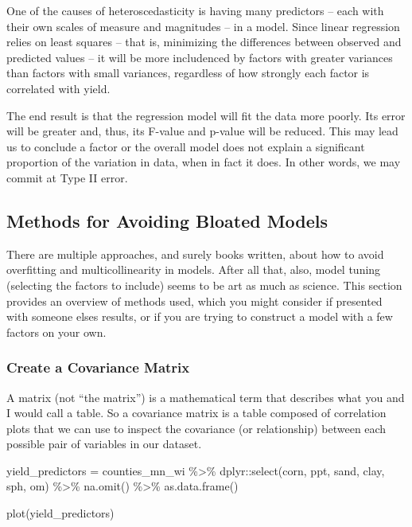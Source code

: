\documentclass[
]{book}
\newenvironment{Shaded}{\begin{snugshade}}{\end{snugshade}}
\newcommand{\FunctionTok}[1]{\textcolor[rgb]{0.00,0.00,0.00}{#1}}
\newcommand{\NormalTok}[1]{#1}
\newcommand{\OtherTok}[1]{\textcolor[rgb]{0.56,0.35,0.01}{#1}}
\newcommand{\SpecialCharTok}[1]{\textcolor[rgb]{0.00,0.00,0.00}{#1}}
\begin{document}
One of the causes of heteroscedasticity is having many predictors -- each with their own scales of measure and magnitudes -- in a model. Since linear regression relies on least squares -- that is, minimizing the differences between observed and predicted values -- it will be more includenced by factors with greater variances than factors with small variances, regardless of how strongly each factor is correlated with yield.

The end result is that the regression model will fit the data more poorly. Its error will be greater and, thus, its F-value and p-value will be reduced. This may lead us to conclude a factor or the overall model does not explain a significant proportion of the variation in data, when in fact it does. In other words, we may commit at Type II error.

\hypertarget{methods-for-avoiding-bloated-models}{%
\subsection{Methods for Avoiding Bloated Models}\label{methods-for-avoiding-bloated-models}}

There are multiple approaches, and surely books written, about how to avoid overfitting and multicollinearity in models. After all that, also, model tuning (selecting the factors to include) seems to be art as much as science. This section provides an overview of methods used, which you might consider if presented with someone elses results, or if you are trying to construct a model with a few factors on your own.

\hypertarget{create-a-covariance-matrix}{%
\subsubsection{Create a Covariance Matrix}\label{create-a-covariance-matrix}}

A matrix (not ``the matrix'') is a mathematical term that describes what you and I would call a table. So a covariance matrix is a table composed of correlation plots that we can use to inspect the covariance (or relationship) between each possible pair of variables in our dataset.

\begin{Shaded}
\begin{Highlighting}[]
\NormalTok{yield\_predictors }\OtherTok{=}\NormalTok{ counties\_mn\_wi }\SpecialCharTok{\%\textgreater{}\%}
\NormalTok{  dplyr}\SpecialCharTok{::}\FunctionTok{select}\NormalTok{(corn, ppt, sand, clay, sph, om) }\SpecialCharTok{\%\textgreater{}\%}
  \FunctionTok{na.omit}\NormalTok{() }\SpecialCharTok{\%\textgreater{}\%}
  \FunctionTok{as.data.frame}\NormalTok{()}

\FunctionTok{plot}\NormalTok{(yield\_predictors)}
\end{Highlighting}
\end{Shaded}
\end{document}
